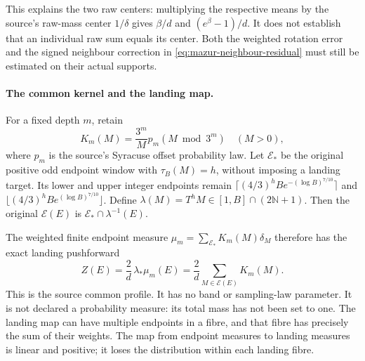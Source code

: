 \documentclass[11pt]{article}
\theoremstyle{remark}\newtheorem{remark}[proposition]{Remark}
\begin{document}
This explains the two raw centers: multiplying the respective means
by the source's raw-mass center $1/\delta$ gives
$\beta/d$ and $(e^\beta-1)/d$. It does not establish that an
individual raw sum equals its center. Both the weighted rotation error
and the signed neighbour correction in
\eqref{eq:mazur-neighbour-residual} must still be estimated on their
actual supports.

\paragraph{The common kernel and the landing map.}
For a fixed depth $m$, retain
\[
 K_m(M)=\frac{3^m}{M}p_m(M\bmod3^m)\quad(M>0),
\]
where $p_m$ is the source's Syracuse offset probability law.
Let $\mathcal E_*$ be the original positive odd endpoint window
with $\tau_B(M)=h$, without imposing a landing target. Its lower
and upper integer endpoints remain
$\lceil(4/3)^hB e^{-(\log B)^{7/10}}\rceil$ and
$\lfloor(4/3)^hB e^{(\log B)^{7/10}}\rfloor$.
Define $\lambda(M)=T^hM\in[1,B]\cap(2\mathbb N+1)$.
Then the original $\mathcal E(E)$ is
$\mathcal E_*\cap\lambda^{-1}(E)$.

The weighted finite endpoint measure $\mu_m=\sum_{\mathcal E_*}
K_m(M)\delta_M$ therefore has the exact landing pushforward
\[
 Z(E)=\frac2d\,\lambda_*\mu_m(E)
     =\frac2d\sum_{M\in\mathcal E(E)}K_m(M).
\]
This is the source common profile. It has no band or sampling-law
parameter. It is not declared a probability measure: its total mass
has not been set to one. The landing map can have multiple endpoints
in a fibre, and that fibre has precisely the sum of their weights.
The map from endpoint measures to landing measures is linear and
positive; it loses the distribution within each landing fibre.
\end{document}
